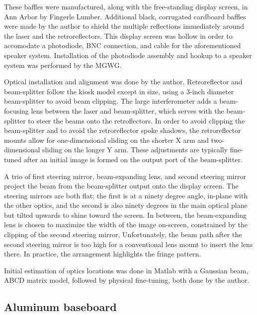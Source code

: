 These baffles were manufactured, along with the free-standing display screen, in Ann Arbor by Fingerle Lumber.
Additional black, corrugated cardboard baffles were made by the author to shield the multiple reflections immediately around the laser and the retroreflectors.
This display screen was hollow in order to accomodate a photodiode, BNC connection, and cable for the aforementioned speaker system.
Installation of the photodiode assembly and hookup to a speaker system was performed by the MGWG.

Optical installation and alignment was done by the author.
Retroreflector and beam-splitter follow the kiosk model except in size, using a 3-inch diameter beam-splitter to avoid beam clipping.
The large interferometer adds a beam-focusing lens between the laser and beam-splitter, which serves with the beam-splitter to steer the beams onto the retroflectors.
In order to avoid clipping the beam-splitter and to avoid the retroreflector spoke shadows, the retroreflector mounts allow for one-dimensional sliding on the shorter X arm and two-dimensional sliding on the longer Y arm.
These adjustments are typically fine-tuned after an initial image is formed on the output port of the beam-splitter.

A trio of first steering mirror, beam-expanding lens, and second steering mirror project the beam from the beam-splitter output onto the display screen.
The steering mirrors are both flat; the first is at a ninety degree angle, in-plane with the other optics, and the second is also ninety degrees in the main optical plane but tilted upwards to shine toward the screen.
In between, the beam-expanding lens is chosen to maximize the width of the image on-screen, constrained by the clipping of the second steering mirror,
Unfortunately, the beam path after the second steering mirror is too high for a conventional lens mount to insert the lens there.
In practice, the arrangement highlights the fringe pattern.

Initial estimation of optics locations was done in Matlab with a Gaussian beam, ABCD matrix model, followed by physical fine-tuning, both done by the author.

        \subsection{Aluminum baseboard}
        \label{baseplate}



